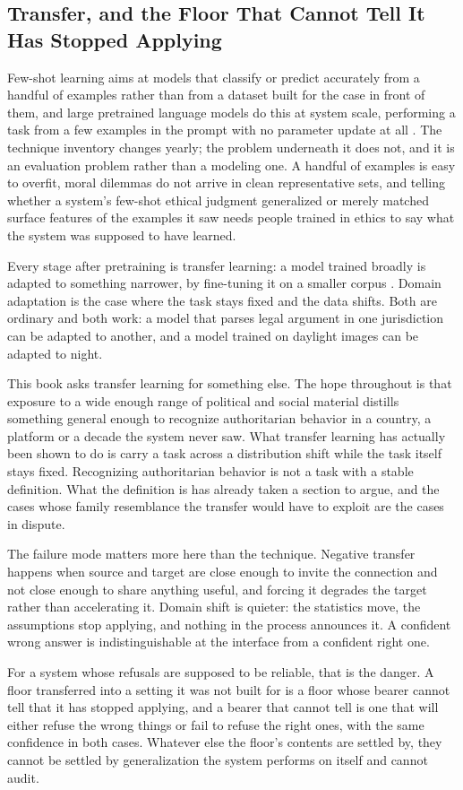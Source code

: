 \subsection{Transfer, and the Floor That Cannot Tell It Has Stopped Applying}
\label{sec:4.2.9}
Few-shot learning aims at models that classify or predict accurately from a handful of examples rather than from a dataset built for the case in front of them, and large pretrained language models do this at system scale, performing a task from a few examples in the prompt with no parameter update at all \autocite{brown2020fewshot}. The technique inventory changes yearly; the problem underneath it does not, and it is an evaluation problem rather than a modeling one. A handful of examples is easy to overfit, moral dilemmas do not arrive in clean representative sets, and telling whether a system's few-shot ethical judgment generalized or merely matched surface features of the examples it saw needs people trained in ethics to say what the system was supposed to have learned.

Every stage after pretraining is transfer learning: a model trained broadly is adapted to something narrower, by fine-tuning it on a smaller corpus \autocite{devlin2018bert}. Domain adaptation is the case where the task stays fixed and the data shifts. Both are ordinary and both work: a model that parses legal argument in one jurisdiction can be adapted to another, and a model trained on daylight images can be adapted to night.

This book asks transfer learning for something else. The hope throughout is that exposure to a wide enough range of political and social material distills something general enough to recognize authoritarian behavior in a country, a platform or a decade the system never saw. What transfer learning has actually been shown to do is carry a task across a distribution shift while the task itself stays fixed. Recognizing authoritarian behavior is not a task with a stable definition. What the definition is has already taken a section to argue, and the cases whose family resemblance the transfer would have to exploit are the cases in dispute.

The failure mode matters more here than the technique. Negative transfer happens when source and target are close enough to invite the connection and not close enough to share anything useful, and forcing it degrades the target rather than accelerating it. Domain shift is quieter: the statistics move, the assumptions stop applying, and nothing in the process announces it. A confident wrong answer is indistinguishable at the interface from a confident right one.

For a system whose refusals are supposed to be reliable, that is the danger. A floor transferred into a setting it was not built for is a floor whose bearer cannot tell that it has stopped applying, and a bearer that cannot tell is one that will either refuse the wrong things or fail to refuse the right ones, with the same confidence in both cases. Whatever else the floor's contents are settled by, they cannot be settled by generalization the system performs on itself and cannot audit.
